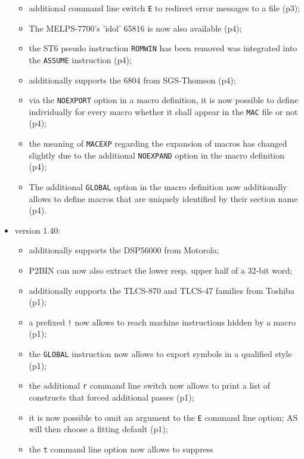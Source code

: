 \documentclass[12pt,twoside]{report}
\newcommand{\tty}[1]{{\tt #1}}
\newcommand{\asname}{{AS}}
\begin{document}
\begin{itemize}
{\begin{itemize}
      \item{additional command line switch \tty{E} to redirect error
            messages to a file (p3);}
      \item{The MELPS-7700's 'idol' 65816 is now also available
            (p4);}
      \item{the ST6 pseudo instruction \tty{ROMWIN} has been removed
            was integrated into the \tty{ASSUME} instruction (p4);}
      \item{additionally supports the 6804 from SGS-Thomson (p4);}
      \item{via the \tty{NOEXPORT} option in a macro definition, it is
            now possible to define individually for every macro
            whether it shall appear in the \tty{MAC} file or not (p4);}
      \item{the meaning of \tty{MACEXP} regarding the expansion of
            macros has changed slightly due to the additional
            \tty{NOEXPAND} option in the macro definition (p4);}
      \item{The additional \tty{GLOBAL} option in the macro definition
            now additionally allows to define macros that are
            uniquely identified by their section name (p4).}
      \end{itemize}}
\item{version 1.40:
      \begin{itemize}
      \item{additionally supports the DSP56000 from Motorola;}
      \item{P2BIN can now also extract the lower resp. upper
            half of a 32-bit word;}
      \item{additionally supports the TLCS-870 and TLCS-47
            families from Toshiba (p1);}
      \item{a prefixed \tty{!} now allows to reach machine instructions
            hidden by a macro (p1);}
      \item{the \tty{GLOBAL} instruction now allows to export symbols
            in a qualified style (p1);}
      \item{the additional \tty{r} command line switch now allows to
            print a list of constructs that forced additional
            passes (p1);}
      \item{it is now possible to omit an argument to the \tty{E}
            command line option; \asname{} will then choose a fitting
            default (p1);}
      \item{the \tty{t} command line option now allows to suppress
}
\end{itemize}}
\end{itemize}
\end{document}

